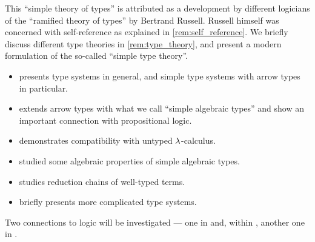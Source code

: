 This \enquote{simple theory of types} is attributed as a development by different logicians of the \enquote{ramified theory of types} by Bertrand Russell. Russell himself was concerned with self-reference as explained in \cref{rem:self_reference}. We briefly discuss different type theories in \cref{rem:type_theory}, and present a modern formulation of the so-called \enquote{simple type theory}.

\begin{itemize}
  \item {} presents type systems in general, and simple type systems with arrow types in particular.
  \item {} extends arrow types with what we call \enquote{simple algebraic types} and show an important connection with propositional logic.
  \item {} demonstrates compatibility with untyped \( {\mathrm \lambda} \)-calculus.
  \item {} studied some algebraic properties of simple algebraic types.
  \item {} studies reduction chains of well-typed terms.
  \item {} briefly presents more complicated type systems.
\end{itemize}

Two connections to logic will be investigated --- one in  and, within , another one in .
